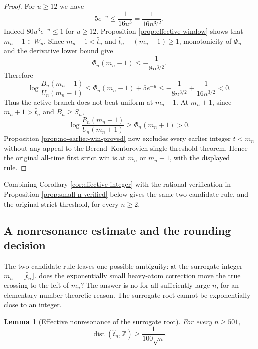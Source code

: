 \documentclass[11pt]{article}
\newtheorem{lemma}[theorem]{Lemma}
\theoremstyle{definition}
\begin{document}
\begin{proof}
For $u\ge12$ we have
\[
  5e^{-u}\le \frac{1}{16u^3}=\frac{1}{16n^{3/2}}.
\]
Indeed $80u^3e^{-u}\le1$ for $u\ge12$.  Proposition \ref{prop:effective-window} shows that $m_n-1\in W_n$.  Since $m_n-1<\widehat t_n$ and $\widehat t_n-(m_n-1)\ge1$, monotonicity of $\Phi_n$ and the derivative lower bound give
\[
  \Phi_n(m_n-1)\le -\frac{1}{8n^{3/2}}.
\]
Therefore
\[
  \log\frac{B_n(m_n-1)}{U_n(m_n-1)}
  \le \Phi_n(m_n-1)+5e^{-u}
  \le -\frac{1}{8n^{3/2}}+\frac{1}{16n^{3/2}}<0.
\]
Thus the active branch does not beat uniform at $m_n-1$.  At $m_n+1$, since $m_n+1>\widehat t_n$ and $B_n\ge S_n$,
\[
  \log\frac{B_n(m_n+1)}{U_n(m_n+1)}
  \ge \Phi_n(m_n+1)>0.
\]
Proposition \ref{prop:no-earlier-win-proved} now excludes every earlier integer $t<m_n$ without any appeal to the Berend--Kontorovich single-threshold theorem.  Hence the original all-time first strict win is at $m_n$ or $m_n+1$, with the displayed rule.
\end{proof}

Combining Corollary \ref{cor:effective-integer} with the rational verification in Proposition \ref{prop:small-n-verified} below gives the same two-candidate rule, and the original strict threshold, for every $n\ge2$.


\subsection{A nonresonance estimate and the rounding decision}

The two-candidate rule leaves one possible ambiguity: at the surrogate integer
\(m_n=\lfloor\widehat t_n\rfloor\), does the exponentially small heavy-atom correction move the true crossing to the left of \(m_n\)?  The answer is no for all sufficiently large \(n\), for an elementary number-theoretic reason.  The surrogate root cannot be exponentially close to an integer.

\begin{lemma}[Effective nonresonance of the surrogate root]\label{lem:nonresonance}
For every \(n\ge501\),
\[
  \operatorname{dist}(\widehat t_n,\mathbb Z)\ge \frac{1}{100\sqrt n}.
\]
\end{lemma}
\end{document}
